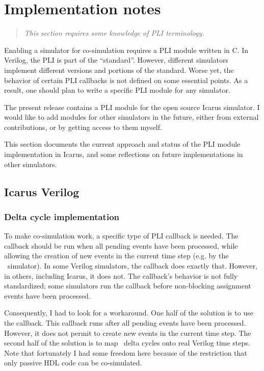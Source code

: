 \section{Implementation notes \label{cosim-impl}}

\begin{quote}
\em
This section requires some knowledge of PLI terminology.
\end{quote}

Enabling a simulator for co-simulation requires a PLI module written
in C. In Verilog, the PLI is part of the ``standard''.  However,
different simulators implement different versions and portions of the
standard. Worse yet, the behavior of certain PLI callbacks is not
defined on some essential points.  As a result, one should plan to
write a specific PLI module for any simulator.

The present release contains a PLI module for the open source Icarus
simulator. I would like to add modules for other simulators in the
future, either from external contributions, or by getting access to
them myself.

This section documents the current approach and status of the PLI
module implementation in Icarus, and some reflections on future
implementations in other simulators.

\subsection{Icarus Verilog \label{cosim-icarus}}

\subsubsection{Delta cycle implementation \label{cosim-icarus-delta}}

To make co-simulation work, a specific type of PLI callback is
needed. The callback should be run when all pending events have been
processed, while allowing the creation of new events in the current
time step (e.g. by the \myhdl\ simulator).  In some Verilog
simulators, the  callback does exactly
that. However, in others, including Icarus, it does not. The
callback's behavior is not fully standardized; some simulators run the
callback before non-blocking assignment events have been processed.

Consequently, I had to look for a workaround. One half of the solution
is to use the  callback.  This callback runs
after all pending events have been processed.  However, it does not
permit to create new events in the current time step.  The second half
of the solution is to map \myhdl\ delta cycles onto real Verilog time
steps.  Note that fortunately I had some freedom here because of the
restriction that only passive HDL code can be co-simulated.

